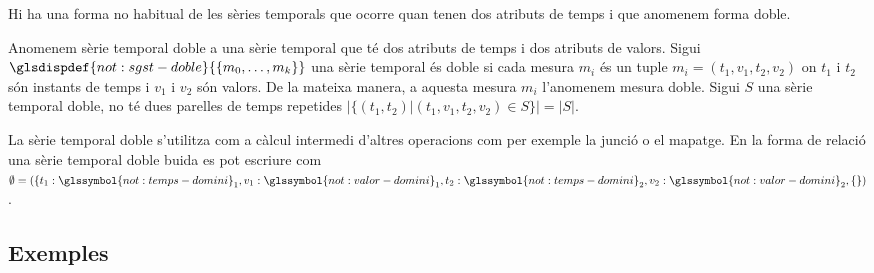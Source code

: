   



Hi ha una forma no habitual de les sèries temporals que ocorre quan
tenen dos atributs de temps i que anomenem forma doble.

\begin{definition}
  \label{def:sgst:st-doble}
  Anomenem sèrie temporal doble a una sèrie temporal que té dos
  atributs de temps i dos atributs de valors. Sigui
  $\glsdispdef{not:sgst-doble}{\{m_0, \dotsc, m_k\}}$ una sèrie
  temporal és doble si cada mesura $m_i$ és un tuple
  $m_i=(t_1,v_1,t_2,v_2)$ on $t_1$ i $t_2$ són instants de temps i
  $v_1$ i $v_2$ són valors. De la mateixa manera, a aquesta mesura
  $m_i$ l'anomenem mesura doble.  Sigui $S$ una sèrie temporal doble, no té dues
  parelles de temps repetides $|\{(t_1,t_2)| (t_1,v_1,t_2,v_2)\in S\}| = |S|$.
\end{definition}

La sèrie temporal doble s'utilitza com a càlcul intermedi d'altres
operacions com per exemple la junció o el mapatge. En la forma de
relació una sèrie temporal doble buida es pot escriure com $\emptyset
= ( \{t_1: \glssymbol{not:temps-domini}_1,
v_1:\glssymbol{not:valor-domini}_1 , t_2:
\glssymbol{not:temps-domini}_2, v_2: \glssymbol{not:valor-domini}_2,
\{ \} )$.









\subsection{Exemples}


